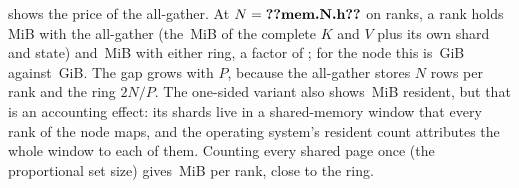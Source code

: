  shows the price of the all-gather. At $N=\n{mem.N.h}$ on
 ranks, a rank holds \,MiB with the all-gather (the
\,MiB of the complete $K$ and $V$ plus its own shard and state) and
\,MiB with either ring, a factor of ; for the node this
is \,GiB against \,GiB. The gap grows
with $P$, because the all-gather stores $N$ rows per rank and the ring $2N/P$. The
one-sided variant also shows \,MiB resident, but that is an
accounting effect: its shards live in a shared-memory window that every rank of the
node maps, and the operating system's resident count attributes the whole window to
each of them. Counting every shared page once (the proportional set size) gives
\,MiB per rank, close to the ring.
